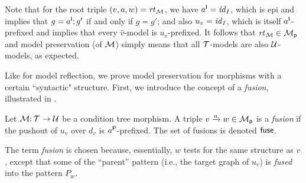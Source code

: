 Note that for the root triple $(v,a,w)=\rtof\cM$, we have $a\I=\id_I$, which is epi and implies that $g=a\I;g'$ if and only if $g=g'$; and also $u_v=\id_I$, which is itself $a\I$-prefixed and implies that every $\hat v$-model is $u_v$-prefixed. It follows that $\rtof\cM\in\cM_\pgen$ and model preservation (of $\cM$) simply means that all $\cT$-models are also $\cU$-models, as expected.
%
\begin{comment}
\begin{definition}[strong model preservation]
Let $\cM\of \cT\to\cU$ be a morphism and let $\trip vaw\in\cM$.
\begin{itemize}[topsep=\smallskipamount]
\item $a$ \emph{preserves} an $a\I$-prefixed $\hat v$-model $g=a\I;g'$ with witness $h$ if $h=a\P;h'$ for some $h'$ such that $g'\sat \hat w$ with witness $h'$.
		
\item Let $u:I_v\to P$ be an $a\I$-prefixed graph morphism. $a$ \emph{strongly preserves $u$-prefixed models} if $a$ preserves all $u$-prefixed $\hat v$-model/witness pairs.
		
\item $\cM$ strongly preserves models if $\rtof\cM$ strongly preserves $\id$-prefixed models.
\end{itemize}
\end{definition}
\end{comment}
%
Like for model reflection, we prove model preservation for morphisms with a certain ``syntactic" structure. First, we introduce the concept of a \emph{fusion}, illustrated in .

\begin{definition}\label{def:fusion}
Let $\cM\of \cT\to\cU$ be a condition tree morphism. A triple $\trip vaw\in\cM_\pgen$ is a \emph{fusion} if the pushout of $u_v$ over $d_v$ is $a\P$-prefixed. The set of fusions is denoted $\fuse$.
\end{definition}
%
The term \emph{fusion} is chosen because, essentially, $w$ tests for the same structure as $v$, except that some of the ``parent'' pattern (i.e., the target graph of $u_v$) is \emph{fused} into the pattern $P_w$.

